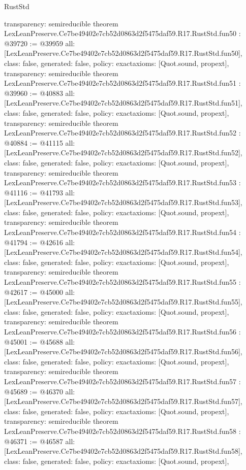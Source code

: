 \begin{lexlean}{RustStd}
\begin{coremodule}
{  transparency: semireducible
}
theorem LexLeanPreserve.Ce7be49402e7cb52d0863d2f5475daf59.R17.RustStd.fun50 : @39720 := @39959 {
  all: [LexLeanPreserve.Ce7be49402e7cb52d0863d2f5475daf59.R17.RustStd.fun50],
  class: false,
  generated: false,
  policy: exact{axioms: [Quot.sound, propext]},
  transparency: semireducible
}
theorem LexLeanPreserve.Ce7be49402e7cb52d0863d2f5475daf59.R17.RustStd.fun51 : @39960 := @40883 {
  all: [LexLeanPreserve.Ce7be49402e7cb52d0863d2f5475daf59.R17.RustStd.fun51],
  class: false,
  generated: false,
  policy: exact{axioms: [Quot.sound, propext]},
  transparency: semireducible
}
theorem LexLeanPreserve.Ce7be49402e7cb52d0863d2f5475daf59.R17.RustStd.fun52 : @40884 := @41115 {
  all: [LexLeanPreserve.Ce7be49402e7cb52d0863d2f5475daf59.R17.RustStd.fun52],
  class: false,
  generated: false,
  policy: exact{axioms: [Quot.sound, propext]},
  transparency: semireducible
}
theorem LexLeanPreserve.Ce7be49402e7cb52d0863d2f5475daf59.R17.RustStd.fun53 : @41116 := @41793 {
  all: [LexLeanPreserve.Ce7be49402e7cb52d0863d2f5475daf59.R17.RustStd.fun53],
  class: false,
  generated: false,
  policy: exact{axioms: [Quot.sound, propext]},
  transparency: semireducible
}
theorem LexLeanPreserve.Ce7be49402e7cb52d0863d2f5475daf59.R17.RustStd.fun54 : @41794 := @42616 {
  all: [LexLeanPreserve.Ce7be49402e7cb52d0863d2f5475daf59.R17.RustStd.fun54],
  class: false,
  generated: false,
  policy: exact{axioms: [Quot.sound, propext]},
  transparency: semireducible
}
theorem LexLeanPreserve.Ce7be49402e7cb52d0863d2f5475daf59.R17.RustStd.fun55 : @42617 := @45000 {
  all: [LexLeanPreserve.Ce7be49402e7cb52d0863d2f5475daf59.R17.RustStd.fun55],
  class: false,
  generated: false,
  policy: exact{axioms: [Quot.sound, propext]},
  transparency: semireducible
}
theorem LexLeanPreserve.Ce7be49402e7cb52d0863d2f5475daf59.R17.RustStd.fun56 : @45001 := @45688 {
  all: [LexLeanPreserve.Ce7be49402e7cb52d0863d2f5475daf59.R17.RustStd.fun56],
  class: false,
  generated: false,
  policy: exact{axioms: [Quot.sound, propext]},
  transparency: semireducible
}
theorem LexLeanPreserve.Ce7be49402e7cb52d0863d2f5475daf59.R17.RustStd.fun57 : @45689 := @46370 {
  all: [LexLeanPreserve.Ce7be49402e7cb52d0863d2f5475daf59.R17.RustStd.fun57],
  class: false,
  generated: false,
  policy: exact{axioms: [Quot.sound, propext]},
  transparency: semireducible
}
theorem LexLeanPreserve.Ce7be49402e7cb52d0863d2f5475daf59.R17.RustStd.fun58 : @46371 := @46587 {
  all: [LexLeanPreserve.Ce7be49402e7cb52d0863d2f5475daf59.R17.RustStd.fun58],
  class: false,
  generated: false,
  policy: exact{axioms: [Quot.sound, propext]},
}
\end{coremodule}
\end{lexlean}
